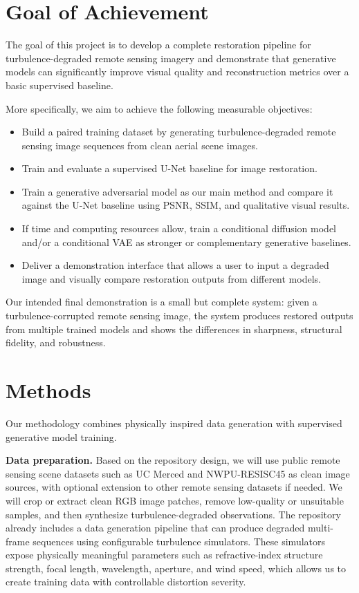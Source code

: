 \documentclass{article}
\begin{document}
\section{Goal of Achievement}
The goal of this project is to develop a complete restoration pipeline for turbulence-degraded remote sensing imagery and demonstrate that generative models can significantly improve visual quality and reconstruction metrics over a basic supervised baseline.

More specifically, we aim to achieve the following measurable objectives:
\begin{itemize}
  \item Build a paired training dataset by generating turbulence-degraded remote sensing image sequences from clean aerial scene images.
  \item Train and evaluate a supervised U-Net baseline for image restoration.
  \item Train a generative adversarial model as our main method and compare it against the U-Net baseline using PSNR, SSIM, and qualitative visual results.
  \item If time and computing resources allow, train a conditional diffusion model and/or a conditional VAE as stronger or complementary generative baselines.
  \item Deliver a demonstration interface that allows a user to input a degraded image and visually compare restoration outputs from different models.
\end{itemize}

Our intended final demonstration is a small but complete system: given a turbulence-corrupted remote sensing image, the system produces restored outputs from multiple trained models and shows the differences in sharpness, structural fidelity, and robustness.

\section{Methods}
Our methodology combines physically inspired data generation with supervised generative model training.

\textbf{Data preparation.} Based on the repository design, we will use public remote sensing scene datasets such as UC Merced and NWPU-RESISC45 as clean image sources, with optional extension to other remote sensing datasets if needed. We will crop or extract clean RGB image patches, remove low-quality or unsuitable samples, and then synthesize turbulence-degraded observations. The repository already includes a data generation pipeline that can produce degraded multi-frame sequences using configurable turbulence simulators. These simulators expose physically meaningful parameters such as refractive-index structure strength, focal length, wavelength, aperture, and wind speed, which allows us to create training data with controllable distortion severity.
\end{document}
